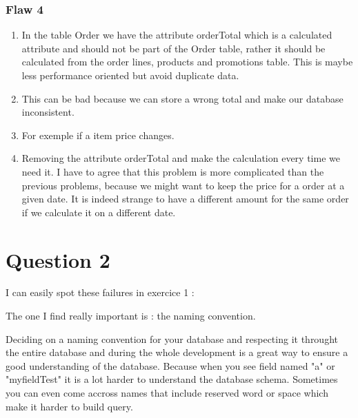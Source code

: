\documentclass[a4paper, 12pt]{article}
\begin{document}
\subsubsection{Flaw 4}

\begin{enumerate}
\item In the table Order we have the attribute orderTotal which is a calculated attribute and should not be part of the Order table, rather it should be calculated from the order lines, products and promotions table. This is maybe less performance oriented but avoid duplicate data.

\item This can be bad because we can store a wrong total and make our database inconsistent.

\item For exemple if a item price changes. 

\item Removing the attribute orderTotal and make the calculation every time we need it. I have to agree that this problem is more complicated than the previous problems, because we might want to keep the price for a order at a given date. 
It is indeed strange to have a different amount for the same order if we calculate it on a different date.
\end{enumerate}


\section{Question 2}

I can easily spot these failures in exercice 1 :


The one I find really important is : the naming convention.

Deciding on a naming convention for your database and respecting it throught the entire database and during the whole development is a great way to ensure a good understanding of the database. Because when you see field named "a" or "myfieldTest" it is a lot harder to understand the database schema. Sometimes you can even come accross names that include reserved word or space which make it harder to build query. 
\end{document}

